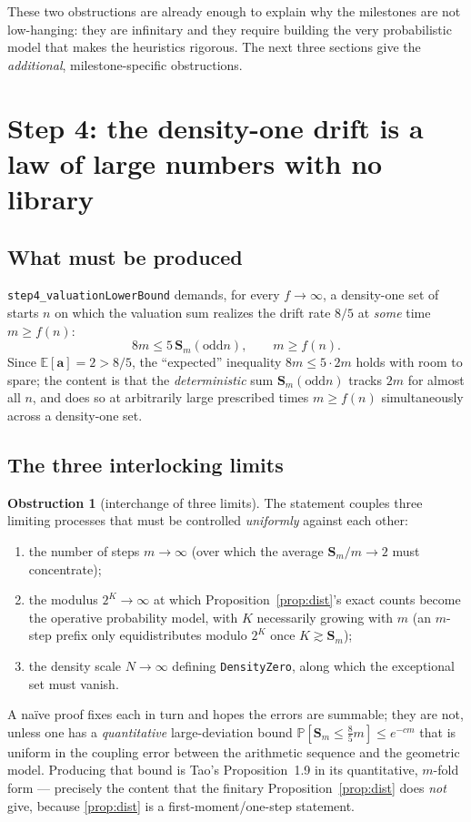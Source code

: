 \documentclass[11pt]{article}
\theoremstyle{plain}
\theoremstyle{definition}
\newtheorem{obstruction}[thm]{Obstruction}
\theoremstyle{remark}
\newcommand{\aval}{\mathbf{a}}
\newcommand{\Ssum}{\mathbf{S}}
\newcommand{\E}{\mathbb{E}}
\newcommand{\Prob}{\mathbb{P}}
\newcommand{\odd}{\mathrm{odd}}
\newcommand{\code}[1]{\texttt{\small #1}}
\begin{document}
These two obstructions are already enough to explain why the milestones are not
low-hanging: they are infinitary and they require building the very
probabilistic model that makes the heuristics rigorous. The next three sections
give the \emph{additional}, milestone-specific obstructions.

\section{Step 4: the density-one drift is a law of large numbers with no library}
\label{sec:step4}

\subsection{What must be produced}

\code{step4\_valuationLowerBound} demands, for every $f\to\infty$, a
density-one set of starts $n$ on which the valuation sum realizes the drift rate
$8/5$ at \emph{some} time $m\ge f(n)$:
\[
  8m \le 5\,\Ssum_m(\odd n),\qquad m\ge f(n).
\]
Since $\E[\aval]=2>8/5$, the ``expected'' inequality $8m\le 5\cdot 2m$ holds with
room to spare; the content is that the \emph{deterministic} sum
$\Ssum_m(\odd n)$ tracks $2m$ for almost all $n$, and does so at arbitrarily
large prescribed times $m\ge f(n)$ simultaneously across a density-one set.

\subsection{The three interlocking limits}

\begin{obstruction}[interchange of three limits]\label{obs:interchange}
The statement couples three limiting processes that must be controlled
\emph{uniformly} against each other:
\begin{enumerate}[label=(\alph*)]
  \item the number of steps $m\to\infty$ (over which the average
        $\Ssum_m/m\to 2$ must concentrate);
  \item the modulus $2^K\to\infty$ at which
        Proposition~\ref{prop:dist}'s exact counts become the operative
        probability model, with $K$ necessarily growing with $m$ (an $m$-step
        prefix only equidistributes modulo $2^{K}$ once $K\gtrsim \Ssum_m$);
  \item the density scale $N\to\infty$ defining
        \code{DensityZero}, along which the exceptional set must vanish.
\end{enumerate}
A na\"ive proof fixes each in turn and hopes the errors are summable; they are
not, unless one has a \emph{quantitative} large-deviation bound
$\Prob[\Ssum_m\le \tfrac{8}{5}m]\le e^{-cm}$ that is uniform in the coupling
error between the arithmetic sequence and the geometric model. Producing that
bound is Tao's Proposition~1.9 in its quantitative, $m$-fold form --- precisely
the content that the finitary Proposition~\ref{prop:dist} does \emph{not} give,
because \ref{prop:dist} is a first-moment/one-step statement.
\end{obstruction}
\end{document}

